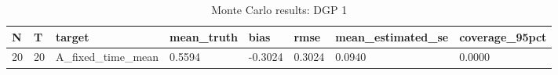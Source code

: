 \begin{table}[!htbp]
\centering
\caption{Monte Carlo results: DGP 1}
\label{tab:mc-dgp1}
\begin{tabular}{llllllll}
\toprule
N & T & target & mean\_truth & bias & rmse & mean\_estimated\_se & coverage\_95pct \\
\midrule
20 & 20 & A\_fixed\_time\_mean & 0.5594 & -0.3024 & 0.3024 & 0.0940 & 0.0000 \\
\bottomrule
\end{tabular}
\end{table}
